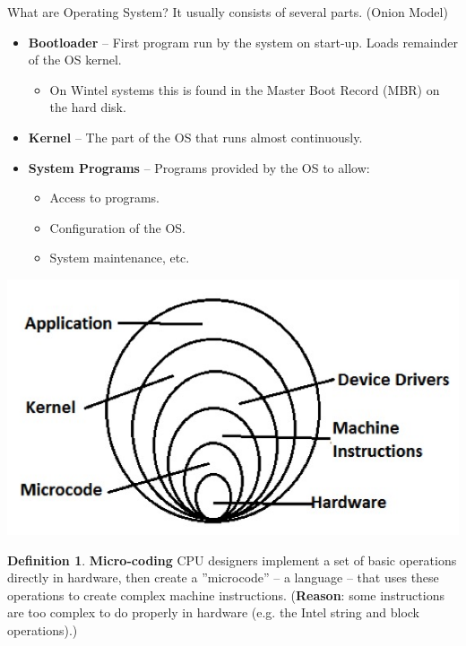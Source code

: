 \documentclass[11pt,a4paper]{article}
\theoremstyle{definition}
\newtheorem{definition}{Definition}[section]
\newenvironment{myitemize}
{ \begin{itemize}
    \setlength{\itemsep}{5pt}
    \setlength{\parskip}{0pt}
    \setlength{\parsep}{0pt}     }
{ \end{itemize}                  }
\begin{document}
\begin{tcolorbox}
	\textsf{What are Operating System?} It usually consists of several parts. (\textsf{Onion Model})
	
	\begin{myitemize}
		\item \textbf{Bootloader} – First program run by the system on start-up. Loads remainder of the OS kernel. 
		\begin{myitemize}
			\item On Wintel systems this is found in the Master Boot Record (MBR) on the hard disk.
		\end{myitemize}
		\item \textbf{Kernel} – The part of the OS that runs almost continuously. 
		\item \textbf{System Programs} – Programs provided by the OS to allow:
		\begin{myitemize}
		\item Access to programs.
		\item Configuration of the OS.
		\item System maintenance, etc.
		\end{myitemize}
	\end{myitemize}
		\includegraphics[scale=0.5]{m1/onionModel}
		\centering
\end{tcolorbox}

\begin{definition}{\textbf{Micro-coding}}
	CPU designers implement a set of basic operations directly in hardware, then create a ''microcode'' – a language – that uses these operations to create complex machine instructions. (\textbf{Reason}: some instructions are too complex to do properly in hardware (e.g. the Intel string and block operations).)
\end{definition}
\end{document}
